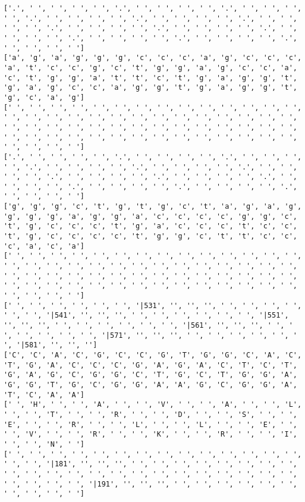 \documentclass{article}
\begin{document}
\begin{Verbatim}
['.', ' ', ' ', ' ', ' ', '.', ' ', ' ', ' ', ' ', '.', ' ', ' ', ' ', ' ', '.', ' ', ' ', ' ', ' ', '.', ' ', ' ', ' ', ' ', '.', ' ', ' ', ' ', ' ', '.', ' ', ' ', ' ', ' ', '.', ' ', ' ', ' ', ' ', '.', ' ', ' ', ' ', ' ', '.', ' ', ' ', ' ', ' ', '.', ' ', ' ', ' ', ' ', '.', ' ', ' ', ' ', ' ']
['a', 'g', 'a', 'g', 'g', 'g', 'c', 'c', 'c', 'a', 'g', 'c', 'c', 'c', 'a', 't', 'c', 'c', 'g', 'c', 't', 'g', 'g', 'a', 'g', 'c', 'c', 'a', 'c', 't', 'g', 'g', 'a', 't', 't', 'c', 't', 'g', 'a', 'g', 'g', 't', 'g', 'a', 'g', 'c', 'c', 'a', 'g', 'g', 't', 'g', 'a', 'g', 'g', 't', 'g', 'c', 'a', 'g']
[' ', ' ', ' ', ' ', ' ', ' ', ' ', ' ', ' ', ' ', ' ', ' ', ' ', ' ', ' ', ' ', ' ', ' ', ' ', ' ', ' ', ' ', ' ', ' ', ' ', ' ', ' ', ' ', ' ', ' ', ' ', ' ', ' ', ' ', ' ', ' ', ' ', ' ', ' ', ' ', ' ', ' ', ' ', ' ', ' ', ' ', ' ', ' ', ' ', ' ', ' ', ' ', ' ', ' ', ' ', ' ', ' ', ' ', ' ', ' ']
['.', ' ', ' ', ' ', ' ', '.', ' ', ' ', ' ', ' ', '.', ' ', ' ', ' ', ' ', '.', ' ', ' ', ' ', ' ', '.', ' ', ' ', ' ', ' ', '.', ' ', ' ', ' ', ' ', '.', ' ', ' ', ' ', ' ', '.', ' ', ' ', ' ', ' ', '.', ' ', ' ', ' ', ' ', '.', ' ', ' ', ' ', ' ', '.', ' ', ' ', ' ', ' ', '.', ' ', ' ', ' ', ' ']
['g', 'g', 'g', 'c', 't', 'g', 't', 'g', 'c', 't', 'a', 'g', 'a', 'g', 'g', 'g', 'g', 'a', 'g', 'g', 'a', 'c', 'c', 'c', 'c', 'g', 'g', 'c', 't', 'g', 'c', 'c', 'c', 't', 'g', 'a', 'c', 'c', 'c', 't', 'c', 'c', 't', 'g', 'c', 'c', 'c', 'c', 't', 'g', 'g', 'c', 't', 't', 'c', 'c', 'c', 'a', 'c', 'a']
[' ', ' ', ' ', ' ', ' ', ' ', ' ', ' ', ' ', ' ', ' ', ' ', ' ', ' ', ' ', ' ', ' ', ' ', ' ', ' ', ' ', ' ', ' ', ' ', ' ', ' ', ' ', ' ', ' ', ' ', ' ', ' ', ' ', ' ', ' ', ' ', ' ', ' ', ' ', ' ', ' ', ' ', ' ', ' ', ' ', ' ', ' ', ' ', ' ', ' ', ' ', ' ', ' ', ' ', ' ', ' ', ' ', ' ', ' ', ' ']
[' ', ' ', ' ', ' ', ' ', ' ', '|531', '', '', '', ' ', ' ', ' ', ' ', ' ', ' ', '|541', '', '', '', ' ', ' ', ' ', ' ', ' ', ' ', '|551', '', '', '', ' ', ' ', ' ', ' ', ' ', ' ', '|561', '', '', '', ' ', ' ', ' ', ' ', ' ', ' ', '|571', '', '', '', ' ', ' ', ' ', ' ', ' ', ' ', '|581', '', '', '']
['C', 'C', 'A', 'C', 'G', 'C', 'C', 'G', 'T', 'G', 'G', 'C', 'A', 'C', 'T', 'G', 'A', 'C', 'C', 'C', 'G', 'A', 'G', 'A', 'C', 'T', 'C', 'T', 'G', 'A', 'G', 'C', 'G', 'G', 'C', 'T', 'G', 'C', 'T', 'G', 'G', 'A', 'G', 'G', 'T', 'G', 'C', 'G', 'G', 'A', 'A', 'G', 'C', 'G', 'G', 'A', 'T', 'C', 'A', 'A']
[' ', 'H', ' ', ' ', 'A', ' ', ' ', 'V', ' ', ' ', 'A', ' ', ' ', 'L', ' ', ' ', 'T', ' ', ' ', 'R', ' ', ' ', 'D', ' ', ' ', 'S', ' ', ' ', 'E', ' ', ' ', 'R', ' ', ' ', 'L', ' ', ' ', 'L', ' ', ' ', 'E', ' ', ' ', 'V', ' ', ' ', 'R', ' ', ' ', 'K', ' ', ' ', 'R', ' ', ' ', 'I', ' ', ' ', 'N', ' ']
[' ', ' ', ' ', ' ', ' ', ' ', ' ', ' ', ' ', ' ', ' ', ' ', ' ', ' ', ' ', ' ', '|181', '', '', '', ' ', ' ', ' ', ' ', ' ', ' ', ' ', ' ', ' ', ' ', ' ', ' ', ' ', ' ', ' ', ' ', ' ', ' ', ' ', ' ', ' ', ' ', ' ', ' ', ' ', ' ', '|191', '', '', '', ' ', ' ', ' ', ' ', ' ', ' ', ' ', ' ', ' ', ' ']
  

\end{Verbatim}
\end{document}
